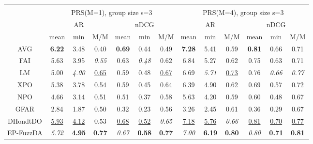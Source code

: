\begin{tabular}{ c | c c c | c c c || c c c | c c c}
\multicolumn{12}{c}{} \\
\multicolumn{1}{c}{} & \multicolumn{6}{c}{PRS(M=1), group size s=3} & \multicolumn{6}{c}{PRS(M=4), group size s=3} \\
\multicolumn{1}{c}{} & \multicolumn{3}{c}{AR} & \multicolumn{3}{c}{nDCG} & \multicolumn{3}{c}{AR} & \multicolumn{3}{c}{nDCG} \\
& mean & min & M/M & mean & min & M/M & mean & min & M/M & mean & min & M/M \\
\hline
AVG & \textbf{6.22} & 3.48 & 0.40 & \textbf{0.69} & 0.44 & 0.49 & \textbf{7.28} & 5.41 & 0.59 & \textbf{0.81} & 0.66 & 0.71 \\
FAI & 5.63 & 3.95 & \textit{0.55} & 0.63 & \textit{0.48} & 0.62 & 6.84 & 5.27 & 0.62 & 0.75 & 0.63 & 0.71 \\
LM & 5.00 & \textit{4.00} & \underline{0.65} & 0.59 & 0.48 & \underline{0.67} & 6.69 & \textit{5.71} & \underline{0.73} & 0.76 & \textit{0.66} & \textit{0.77} \\
XPO & 5.38 & 3.78 & 0.54 & 0.59 & 0.45 & 0.64 & 6.39 & 4.90 & 0.62 & 0.69 & 0.57 & 0.72 \\
NPO & 4.66 & 3.14 & 0.51 & 0.51 & 0.37 & 0.58 & 5.63 & 4.20 & 0.59 & 0.60 & 0.48 & 0.67 \\
GFAR & 2.84 & 1.87 & 0.50 & 0.32 & 0.23 & 0.56 & 3.26 & 2.45 & 0.61 & 0.36 & 0.29 & 0.67 \\
DHondtDO & \underline{5.93} & \underline{4.12} & 0.53 & \underline{0.68} & \underline{0.52} & \textit{0.65} & \underline{7.18} & \underline{5.76} & \textit{0.66} & \underline{0.81} & \underline{0.70} & \underline{0.77} \\
EP-FuzzDA & \textit{5.72} & \textbf{4.95} & \textbf{0.77} & \textit{0.67} & \textbf{0.58} & \textbf{0.77} & \textit{7.00} & \textbf{6.19} & \textbf{0.80} & \textit{0.80} & \textbf{0.71} & \textbf{0.81} \\


\end{tabular}
